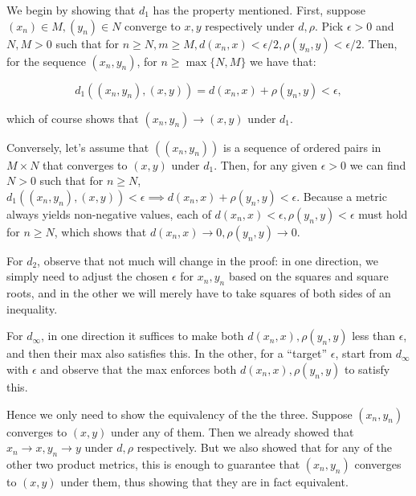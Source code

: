 \begin{solution}
    
    We begin by showing that $d_1$ has the property mentioned.
    First, suppose $(x_n) \in M, (y_n) \in N$ converge to $x, y$ respectively under $d, \rho$.
    Pick $\epsilon > 0$ and $N, M > 0$ such that for $n \geq N, m \geq M, d(x_n, x) < \epsilon/2, \rho(y_n, y) < \epsilon/2$.
    Then, for the sequence $(x_n, y_n)$, for $n \geq \max\{N, M\}$ we have that:

    $$d_1((x_n, y_n), (x, y)) = d(x_n, x) + \rho(y_n, y) < \epsilon,$$

    which of course shows that $(x_n, y_n) \rightarrow (x, y)$ under $d_1$.

    Conversely, let's assume that $((x_n, y_n))$ is a sequence of ordered pairs in $M \times N$ that converges to $(x, y)$ under $d_1$.
    Then, for any given $\epsilon > 0$ we can find $N > 0$ such that for $n \geq N$, $d_1((x_n, y_n), (x, y)) < \epsilon \implies d(x_n, x) + \rho(y_n, y) < \epsilon$.
    Because a metric always yields non-negative values, each of $d(x_n, x) < \epsilon, \rho(y_n, y) < \epsilon$ must hold for $n \geq N$, which shows that $d(x_n, x) \rightarrow 0, \rho(y_n, y) \rightarrow 0$.

    For $d_2$, observe that not much will change in the proof: in one direction, we simply need to adjust the chosen $\epsilon$ for $x_n, y_n$ based on the squares and square roots, and in the other we will merely have to take squares of both sides of an inequality.

    For $d_{\infty}$, in one direction it suffices to make both $d(x_n, x), \rho(y_n, y)$ less than $\epsilon$, and then their max also satisfies this.
    In the other, for a ``target'' $\epsilon$, start from $d_{\infty}$ with $\epsilon$ and observe that the max enforces both $d(x_n, x), \rho(y_n, y)$ to satisfy this.

    Hence we only need to show the equivalency of the the three.
    Suppose $(x_n, y_n)$ converges to $(x, y)$  under any of them.
    Then we already showed that $x_n \rightarrow x, y_n \rightarrow y$ under $d, \rho$ respectively.
    But we also showed that for any of the other two product metrics, this is enough to guarantee that $(x_n, y_n)$ converges to $(x, y)$ under them, thus showing that they are in fact equivalent.

\end{solution}